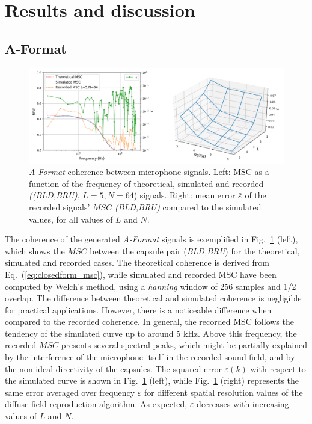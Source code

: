 \section{Results and discussion}
\subsection{\label{subsec:results_aformat}A-Format}

\begin{figure}
	\includegraphics[width=\textwidth]{Figures/CoherenceEstimation/Figure1}
    \caption{\label{fig:Fig1}\textit{A-Format} coherence between microphone signals. Left: $\text{MSC}$ as a function of the frequency of theoretical, simulated and recorded \textit{((BLD,BRU)},  $L=5, N=64$) signals. Right: mean error $\bar{\varepsilon}$ of the recorded signals' $MSC$ \textit{(BLD,BRU)} compared to the simulated values, for all values of $L$ and $N$.}
\end{figure}


The coherence of the generated \textit{A-Format} signals is exemplified in Fig.~\ref{fig:Fig1} (left), which shows the $MSC$ between the capsule pair (\textit{BLD,BRU}) for the theoretical, simulated and recorded cases.
The theoretical coherence is derived from Eq.~(\ref{eq:closedform_msc}), while simulated and recorded MSC have been computed by Welch's method, using a \textit{hanning} window of 256 samples and 1/2 overlap.
The difference between theoretical and simulated coherence is negligible for practical applications.
However, there is a noticeable difference when compared to the recorded coherence. 
In general, the recorded $\text{MSC}$ follows the tendency of the simulated curve up to around 5 kHz.
Above this frequency, the recorded $MSC$ presents several spectral peaks, which might be partially explained by the interference of the microphone itself in the recorded sound field, and by the non-ideal directivity of the capsules.
The squared error $\varepsilon(k)$ with respect to the simulated curve is shown in Fig.~\ref{fig:Fig1} (left), while Fig.~\ref{fig:Fig1} (right) represents the same error averaged over frequency $\bar{\varepsilon}$ for different spatial resolution values of the diffuse field reproduction algorithm.
As expected, $\bar{\varepsilon}$ decreases with increasing values of $L$ and $N$.





